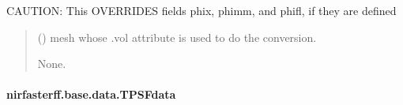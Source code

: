 \documentclass[letterpaper,10pt,english]{sphinxmanual}
\begin{document}
\begin{fulllineitems}
\begin{fulllineitems}
\sphinxAtStartPar
CAUTION: This OVERRIDES fields phix, phimm, and phifl, if they are defined
\begin{quote}\begin{description}
\sphinxAtStartPar
{} () \textendash{} mesh whose .vol attribute is used to do the conversion.

\sphinxAtStartPar
None.

\end{description}\end{quote}

\end{fulllineitems}


\end{fulllineitems}


\sphinxstepscope


\paragraph{nirfasterff.base.data.TPSFdata}
\label{\detokenize{_autosummary/nirfasterff.base.data.TPSFdata:nirfasterff-base-data-tpsfdata}}\label{\detokenize{_autosummary/nirfasterff.base.data.TPSFdata::doc}}
\end{document}
